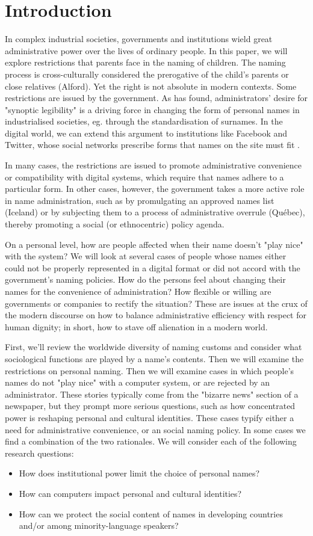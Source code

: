 \section{Introduction}

In complex industrial societies, governments and institutions wield great
administrative power over the lives of ordinary people. In this paper, we will
explore restrictions that parents face in the naming of children. The naming
process is cross-culturally considered the prerogative of the child's parents or
close relatives (Alford). Yet the right is not absolute in modern contexts. Some
restrictions are issued by the government. As \textcite{scott02} has found,
administrators' desire for "synoptic legibility" is a driving force in changing
the form of personal names in industrialised societies, eg. through the
standardisation of surnames.  In the digital world, we can extend this argument
to institutions like Facebook and Twitter, whose social networks prescribe forms
that names on the site must fit \parencite{what-names-fb}.

In many cases, the restrictions are issued to promote administrative convenience
or compatibility with digital systems, which require that names adhere to a
particular form. In other cases, however, the government takes a more active
role in name administration, such as by promulgating an approved names list
(Iceland) or by subjecting them to a process of administrative overrule
(Québec), thereby promoting a social (or ethnocentric) policy agenda.

On a personal level, how are people affected when their name doesn't "play nice"
with the system? We will look at several cases of people whose names either
could not be properly represented in a digital format or did not accord with the
government's naming policies. How do the persons feel about changing their names
for the convenience of administration? How flexible or willing are governments
or companies to rectify the situation? These are issues at the crux of the
modern discourse on how to balance administrative efficiency with respect for
human dignity; in short, how to stave off alienation in a modern world.

First, we'll review the worldwide diversity of naming customs and consider what
sociological functions are played by a name's contents. Then we will examine the
restrictions on personal naming. Then we will examine cases in which people's
names do not "play nice" with a computer system, or are rejected by an
administrator. These stories typically come from the "bizarre news" section of a
newspaper, but they prompt more serious questions, such as how concentrated
power is reshaping personal and cultural identities. These cases typify either a
need for administrative convenience, or an social naming policy. In some cases
we find a combination of the two rationales. We will consider each of the
following research questions:

\begin{itemize}
\item How does institutional power limit the choice of personal names?
\item How can computers impact personal and cultural identities?
\item How can we protect the social content of names in developing countries
and/or among minority-language speakers?
\end{itemize}
